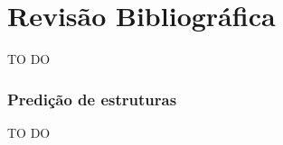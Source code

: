 
\chapter{Revisão Bibliográfica}
{\color{red} TO DO}
\cite{aminodist}
\subsection{Predição de estruturas}
{\color{red} TO DO}
\label{subsection:structure_pred}




